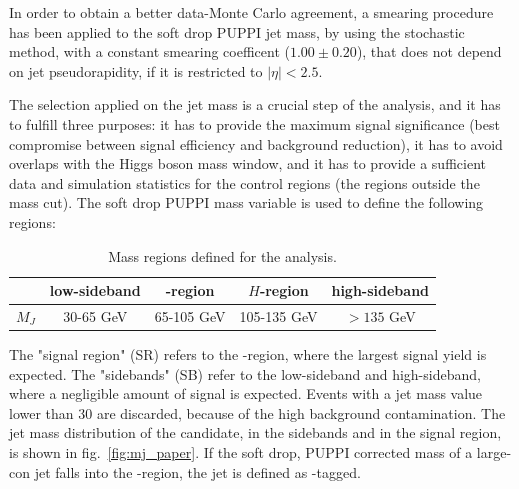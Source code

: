 \noindent In order to obtain a better data-Monte Carlo agreement, a smearing procedure has been applied to the soft drop PUPPI jet mass, by using the stochastic method, with a constant smearing coefficent ($1.00 \pm 0.20$), that does not depend on jet pseudorapidity, if it is restricted to $|\eta|<2.5$.

\vspace*{1\baselineskip}

\noindent The selection applied on the jet mass is a crucial step of the analysis, and it has to fulfill three purposes: it has to provide the maximum signal significance (best compromise between signal efficiency and background reduction), it has to avoid overlaps with the Higgs boson mass window, and it has to provide a sufficient data and simulation statistics for the control regions (the regions outside the mass cut). The soft drop PUPPI mass variable is used to define the following regions:

\begin{table}[!htb]
  \begin{center}
\caption{Mass regions defined for the analysis.\label{tab:massregions}}
  \begin{tabular}{l|cccc}
  & low-sideband & \V-region & $H$-region & high-sideband \\
 \hline
 \hline
 $M_{J}$ & 30-65 GeV & 65-105 GeV & 105-135 GeV & $> 135$ GeV\\ 
 \end{tabular}
 \end{center}
 \label{tab:SR-SB}
\end{table}

\noindent The "signal region" (SR) refers to the \V-region, where the largest signal yield is expected. The "sidebands" (SB) refer to the low-sideband and high-sideband, where a negligible amount of signal is expected. Events with a jet mass value lower than 30 \GeV are discarded, because of the high background contamination. The jet mass distribution of the \V candidate, in the sidebands and in the signal region, is shown in fig.~\ref{fig:mj_paper}. If the soft drop, PUPPI corrected mass of a large-con jet falls into the \V-region, the jet is defined as \V-tagged.


